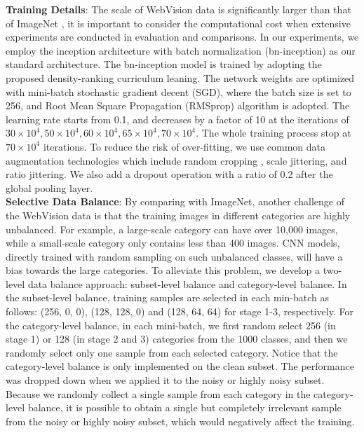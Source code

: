 \documentclass[runningheads]{llncs}
\begin{document}
\noindent\textbf{Training Details}: The scale of WebVision data \cite{li2017webvisiondata} is significantly larger than  that of ImageNet \cite{DengDSLL009}, it is important to consider the computational cost when extensive experiments are conducted in evaluation and comparisons. In our experiments, we employ the inception architecture with batch normalization (bn-inception) \cite{ioffe2015batch} as our standard architecture.  The bn-inception model is trained by adopting the proposed density-ranking curriculum leaning. The network weights are optimized with mini-batch stochastic gradient decent (SGD), where the batch size is set to 256, and Root Mean Square Propagation (RMSprop) algorithm \cite{ioffe2015batch} is adopted. The learning rate starts from 0.1, and decreases by a factor of 10 at the iterations of $30\times10^4, 50\times 10^4, 60\times 10^4, 65\times10^4, 70\times10^4$.
The whole training process stop at $70\times 10^4$ iterations. To reduce the risk of over-fitting, we use common data augmentation technologies which include random cropping , scale jittering, and ratio jittering. We also add a dropout operation with a ratio of 0.2 after the global pooling layer. \\

\noindent \textbf{Selective Data Balance}: By comparing with ImageNet, another challenge of the WebVision data \cite{li2017webvision} is that the training images in different categories are highly unbalanced. For example, a large-scale category can have over 10,000 images, while a small-scale category only contains  less than 400 images. CNN models, directly trained with random sampling on such unbalanced classes, will have a bias towards the large categories. To alleviate this problem, we develop a two-level data balance approach: subset-level balance and category-level balance. In the subset-level balance, training samples are selected in each min-batch as follows: (256, 0, 0), (128, 128, 0) and (128, 64, 64) for stage 1-3, respectively. For the category-level balance, in each mini-batch, we first random select 256 (in stage 1) or 128 (in stage 2 and 3) categories from the 1000 classes, and then we randomly select only one sample from each selected category. Notice that the category-level balance is only implemented on the clean subset. The performance was dropped down when we applied it to the noisy or highly noisy subset. Because we randomly collect a single sample from each category in the category-level balance, it is possible to obtain a single but completely irrelevant sample from the noisy or highly noisy subset, which would negatively affect the training.\\
\end{document}
